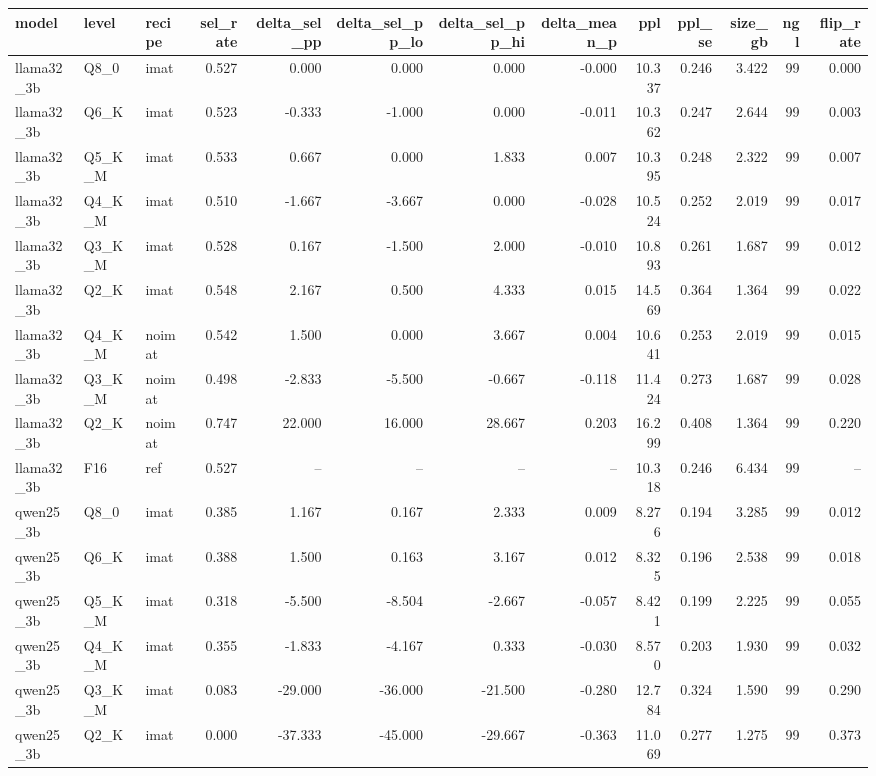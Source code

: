 \begin{tabular}{lllrrrrrrrrrr}
\toprule
model & level & recipe & sel\_rate & delta\_sel\_pp & delta\_sel\_pp\_lo & delta\_sel\_pp\_hi & delta\_mean\_p & ppl & ppl\_se & size\_gb & ngl & flip\_rate \\
\midrule
llama32\_3b & Q8\_0 & imat & 0.527 & 0.000 & 0.000 & 0.000 & -0.000 & 10.337 & 0.246 & 3.422 & 99 & 0.000 \\
llama32\_3b & Q6\_K & imat & 0.523 & -0.333 & -1.000 & 0.000 & -0.011 & 10.362 & 0.247 & 2.644 & 99 & 0.003 \\
llama32\_3b & Q5\_K\_M & imat & 0.533 & 0.667 & 0.000 & 1.833 & 0.007 & 10.395 & 0.248 & 2.322 & 99 & 0.007 \\
llama32\_3b & Q4\_K\_M & imat & 0.510 & -1.667 & -3.667 & 0.000 & -0.028 & 10.524 & 0.252 & 2.019 & 99 & 0.017 \\
llama32\_3b & Q3\_K\_M & imat & 0.528 & 0.167 & -1.500 & 2.000 & -0.010 & 10.893 & 0.261 & 1.687 & 99 & 0.012 \\
llama32\_3b & Q2\_K & imat & 0.548 & 2.167 & 0.500 & 4.333 & 0.015 & 14.569 & 0.364 & 1.364 & 99 & 0.022 \\
llama32\_3b & Q4\_K\_M & noimat & 0.542 & 1.500 & 0.000 & 3.667 & 0.004 & 10.641 & 0.253 & 2.019 & 99 & 0.015 \\
llama32\_3b & Q3\_K\_M & noimat & 0.498 & -2.833 & -5.500 & -0.667 & -0.118 & 11.424 & 0.273 & 1.687 & 99 & 0.028 \\
llama32\_3b & Q2\_K & noimat & 0.747 & 22.000 & 16.000 & 28.667 & 0.203 & 16.299 & 0.408 & 1.364 & 99 & 0.220 \\
llama32\_3b & F16 & ref & 0.527 & -- & -- & -- & -- & 10.318 & 0.246 & 6.434 & 99 & -- \\
qwen25\_3b & Q8\_0 & imat & 0.385 & 1.167 & 0.167 & 2.333 & 0.009 & 8.276 & 0.194 & 3.285 & 99 & 0.012 \\
qwen25\_3b & Q6\_K & imat & 0.388 & 1.500 & 0.163 & 3.167 & 0.012 & 8.325 & 0.196 & 2.538 & 99 & 0.018 \\
qwen25\_3b & Q5\_K\_M & imat & 0.318 & -5.500 & -8.504 & -2.667 & -0.057 & 8.421 & 0.199 & 2.225 & 99 & 0.055 \\
qwen25\_3b & Q4\_K\_M & imat & 0.355 & -1.833 & -4.167 & 0.333 & -0.030 & 8.570 & 0.203 & 1.930 & 99 & 0.032 \\
qwen25\_3b & Q3\_K\_M & imat & 0.083 & -29.000 & -36.000 & -21.500 & -0.280 & 12.784 & 0.324 & 1.590 & 99 & 0.290 \\
qwen25\_3b & Q2\_K & imat & 0.000 & -37.333 & -45.000 & -29.667 & -0.363 & 11.069 & 0.277 & 1.275 & 99 & 0.373 \\

\end{tabular}
